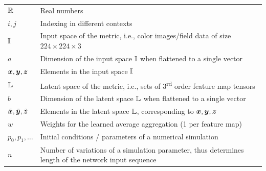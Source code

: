 \bgroup
\def\arraystretch{1.5}
\begin{tabular}{p{2cm}p{5.4cm}}
$\displaystyle {\mathbb{R}}$ & Real numbers \\
$\displaystyle i,j$ & Indexing in different contexts \\
$\displaystyle {\mathbb{I}}$ & Input space of the metric, i.e., color images/field data of size $224\times224\times3$\\
$\displaystyle a$ & Dimension of the input space ${\mathbb{I}}$ when flattened to a single vector\\
$\displaystyle {\bm{x}},{\bm{y}},{\bm{z}}$ & Elements in the input space ${\mathbb{I}}$ \\
$\displaystyle {\mathbb{L}}$ & Latent space of the metric, i.e., sets of 3\textsuperscript{rd} order feature map tensors\\
$\displaystyle b$ & Dimension of the latent space ${\mathbb{L}}$ when flattened to a single vector\\
$\displaystyle \tilde{{\bm{x}}},\tilde{{\bm{y}}},\tilde{{\bm{z}}}$ & Elements in the latent space ${\mathbb{L}}$, corresponding to ${\bm{x}},{\bm{y}},{\bm{z}}$\\
$\displaystyle w$ & Weights for the learned average aggregation (1 per feature map) \\
$\displaystyle p_0, p_1, \dotsc$ & Initial conditions / parameters of a numerical simulation \\
$\displaystyle n$ & Number of variations of a simulation parameter, thus determines length of the network input sequence\\
\end{tabular}
\egroup

